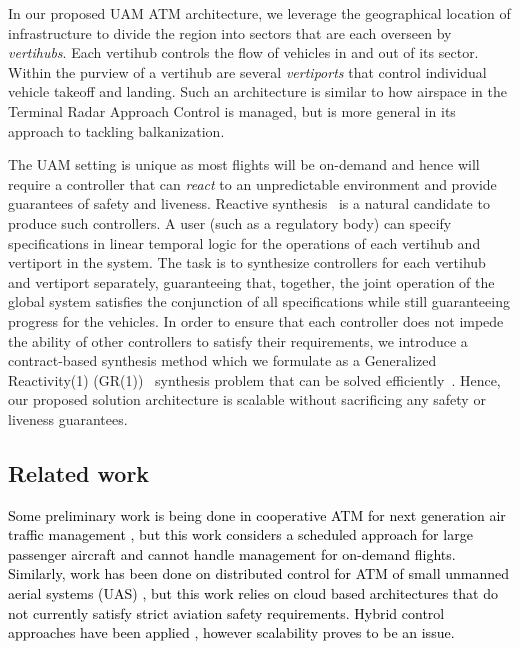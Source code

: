 In our proposed UAM ATM architecture, we leverage the geographical location of infrastructure to divide the region into sectors that are each overseen by \emph{vertihubs}. Each vertihub controls the flow of vehicles in and out of its sector. Within the purview of a vertihub are several \emph{vertiports} that control individual vehicle takeoff and landing. Such an architecture is similar to how airspace in the Terminal Radar Approach Control is managed, but is more general in its approach to tackling balkanization. 

The UAM setting is unique as most flights will be on-demand and hence will require a controller that can \emph{react} to an unpredictable environment and provide guarantees of safety and liveness. Reactive synthesis~\cite{bloem2018graph} is a natural candidate to produce such controllers. A user (such as a regulatory body) can specify specifications in linear temporal logic for the operations of each vertihub and vertiport in the system. The task is to synthesize controllers for each vertihub and vertiport separately, guaranteeing that, together, the joint operation of the global system satisfies the conjunction of all specifications while still guaranteeing progress for the vehicles. In order to ensure that each controller does not impede the ability of other controllers to satisfy their requirements, we introduce a contract-based synthesis method which we formulate as a Generalized Reactivity(1) (GR(1))~\cite{bloem2012synthesis} synthesis problem that can be solved efficiently~\cite{wolff2013efficient,alur2016compositional}. Hence, our proposed solution architecture is scalable without sacrificing any safety or liveness guarantees. 
 
\subsection{Related work}

\textcolor{black}{ Some preliminary work is being done in cooperative ATM for next generation air traffic management \cite{prevot2005co}, but this work considers a scheduled approach for large passenger aircraft and cannot handle management for on-demand flights. Similarly, work has been done on distributed control for ATM of small unmanned aerial systems (UAS) \cite{FSLLK2015}, but this work relies on cloud based architectures that do not currently satisfy strict aviation safety requirements.  Hybrid control approaches have been applied \cite{tomlin1996hybrid}, however scalability proves to be an issue.}


